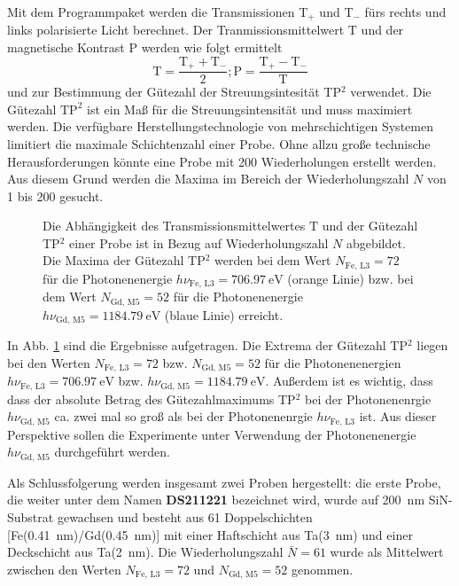 \noindent
Mit dem Programmpaket werden die Transmissionen T$_+$ und T$_-$ fürs rechts und links polarisierte Licht berechnet. Der Tranmissionsmittelwert T und der magnetische Kontrast P werden wie folgt ermittelt
\begin{equation}
    \text{T} = \frac{\text{T}_+ + \text{T}_-}{2}; \text{P} = \frac{\text{T}_+ - \text{T}_-}{\text{T}}
\end{equation}
und zur Bestimmung der Gütezahl der Streuungsintesität TP$^2$ verwendet. Die Gütezahl $\text{TP}^2$ ist ein Maß für die Streuungsintensität und muss maximiert werden. Die verfügbare Herstellungstechnologie von mehrschichtigen Systemen limitiert die maximale Schichtenzahl einer Probe. Ohne allzu große technische Herausforderungen könnte eine Probe mit 200 Wiederholungen erstellt werden. Aus diesem Grund werden die Maxima im Bereich der Wiederholungszahl $N$ von 1 bis 200 gesucht.
\begin{figure}[H]
    \centering
    
    \caption{Die Abhängigkeit des Transmissionsmittelwertes $\text{T}$ und der Gütezahl TP$^2$ einer Probe ist in Bezug auf Wiederholungszahl $N$ abgebildet. Die Maxima der Gütezahl TP$^2$ werden bei dem Wert $N_{\text{Fe, L3}}=72$ für die Photonenenergie $h\nu_{\text{Fe, L3}}=\SI{706,97}{\eV}$ (orange Linie) bzw. bei dem Wert $N_{\text{Gd, M5}}=52$ für die Photonenenergie $h\nu_{\text{Gd, M5}}=\SI{1184,79}{\eV}$ (blaue Linie) erreicht.}
    \label{fig:proben_vergleich_centered}
\end{figure}
\noindent
In Abb. \ref{fig:proben_vergleich_centered} sind die Ergebnisse aufgetragen. Die Extrema der Gütezahl TP$^2$ liegen bei den Werten $N_{\text{Fe, L3}}=72$  bzw. $N_{\text{Gd, M5}}=52$ für die Photonenenergien $h\nu_{\text{Fe, L3}}=\SI{706,97}{\eV}$ bzw. $h\nu_{\text{Gd, M5}}=\SI{1184,79}{\eV}$. Außerdem ist es wichtig, dass dass der absolute Betrag des Gütezahlmaximums TP$^2$ bei der Photonenenrgie $h\nu_{\text{Gd, M5}}$ ca. zwei mal so groß als bei der Photonenenrgie $h\nu_{\text{Fe, L3}}$ ist. Aus dieser Perspektive sollen die Experimente unter Verwendung der Photonenenergie $h\nu_{\text{Gd, M5}}$ durchgeführt werden.

\noindent
Als Schlussfolgerung werden insgesamt zwei Proben hergestellt: die erste Probe, die weiter unter dem Namen \textbf{DS211221} bezeichnet wird, wurde auf \SI{200}{\nano\meter} SiN-Substrat gewachsen und besteht aus 61 Doppelschichten [Fe(\SI{0.41}{\nano\meter})/Gd(\SI{0.45}{\nano\meter})] mit einer Haftschicht aus Ta(\SI{3}{\nano\meter}) und einer Deckschicht aus Ta(\SI{2}{\nano\meter}). Die Wiederholungszahl $\bar{N} = 61$ wurde als Mittelwert zwischen den Werten $N_{\text{Fe, L3}}=72$ und $N_{\text{Gd, M5}}=52$ genommen.

